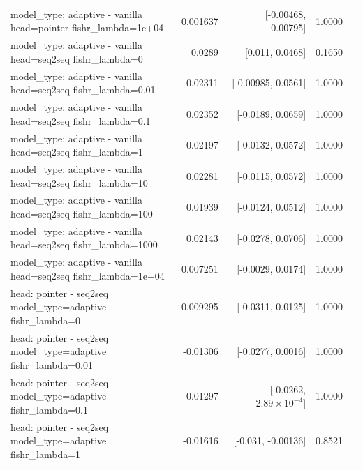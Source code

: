\documentclass[10pt]{article}
\makeatletter
\newcommand{\stackcell}[1]{\begin{tabular}[t]{@{}l@{}}#1\end{tabular}}
\makeatother
\begin{document}
{\begin{longtable}{lrrrl}
\stackcell{model\_type: adaptive - vanilla\\\footnotesize head=pointer fishr\_lambda=1e+04 } & 0.001637 & [-0.00468, 0.00795] & 1.0000 & \\
\stackcell{model\_type: adaptive - vanilla\\\footnotesize head=seq2seq fishr\_lambda=0 } & 0.0289 & [0.011, 0.0468] & 0.1650 & \\
\stackcell{model\_type: adaptive - vanilla\\\footnotesize head=seq2seq fishr\_lambda=0.01 } & 0.02311 & [-0.00985, 0.0561] & 1.0000 & \\
\stackcell{model\_type: adaptive - vanilla\\\footnotesize head=seq2seq fishr\_lambda=0.1 } & 0.02352 & [-0.0189, 0.0659] & 1.0000 & \\
\stackcell{model\_type: adaptive - vanilla\\\footnotesize head=seq2seq fishr\_lambda=1 } & 0.02197 & [-0.0132, 0.0572] & 1.0000 & \\
\stackcell{model\_type: adaptive - vanilla\\\footnotesize head=seq2seq fishr\_lambda=10 } & 0.02281 & [-0.0115, 0.0572] & 1.0000 & \\
\stackcell{model\_type: adaptive - vanilla\\\footnotesize head=seq2seq fishr\_lambda=100 } & 0.01939 & [-0.0124, 0.0512] & 1.0000 & \\
\stackcell{model\_type: adaptive - vanilla\\\footnotesize head=seq2seq fishr\_lambda=1000 } & 0.02143 & [-0.0278, 0.0706] & 1.0000 & \\
\stackcell{model\_type: adaptive - vanilla\\\footnotesize head=seq2seq fishr\_lambda=1e+04 } & 0.007251 & [-0.0029, 0.0174] & 1.0000 & \\
\stackcell{head: pointer - seq2seq\\\footnotesize model\_type=adaptive fishr\_lambda=0 } & -0.009295 & [-0.0311, 0.0125] & 1.0000 & \\
\stackcell{head: pointer - seq2seq\\\footnotesize model\_type=adaptive fishr\_lambda=0.01 } & -0.01306 & [-0.0277, 0.0016] & 1.0000 & \\
\stackcell{head: pointer - seq2seq\\\footnotesize model\_type=adaptive fishr\_lambda=0.1 } & -0.01297 & [-0.0262, $2.89\times10^{-4}$] & 1.0000 & \\
\stackcell{head: pointer - seq2seq\\\footnotesize model\_type=adaptive fishr\_lambda=1 } & -0.01616 & [-0.031, -0.00136] & 0.8521 & \\

\end{longtable}}
\end{document}
